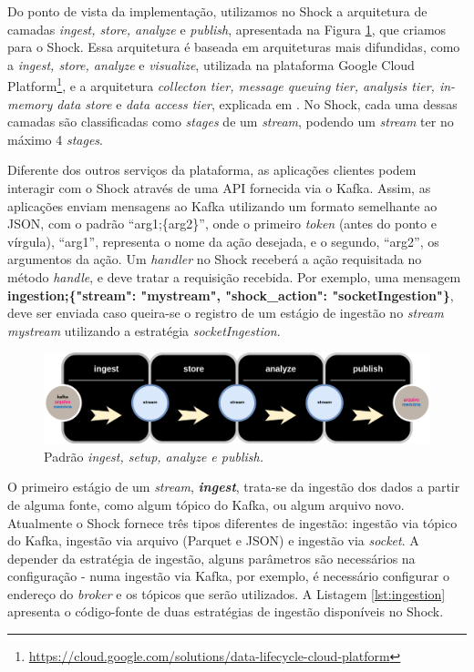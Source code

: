 Do ponto de vista da implementação, utilizamos no Shock a arquitetura de camadas
\textit{ingest, store, analyze} e \textit{publish}, apresentada na Figura
\ref{fig:ingeststore}, que criamos para o Shock. Essa arquitetura é baseada
em arquiteturas mais difundidas, como a \textit{ingest, store, analyze} e
\textit{visualize}, utilizada na plataforma Google Cloud
Platform\footnote{\url{https://cloud.google.com/solutions/data-lifecycle-cloud-platform}},
e a arquitetura \textit{collecton tier, message queuing tier, analysis tier,
in-memory data store} e \textit{data access tier}, explicada em
. No Shock, cada uma dessas camadas são
classificadas como \textit{stages} de um \textit{stream}, podendo um
\textit{stream} ter no máximo 4 \textit{stages}.

Diferente dos outros serviços da plataforma, as aplicações clientes podem interagir
com o Shock através de uma API fornecida via o Kafka. Assim, as aplicações enviam
mensagens ao Kafka utilizando um formato semelhante ao JSON, com o padrão ``arg1;\{arg2\}'',
onde o primeiro \textit{token} (antes do ponto e vírgula), ``arg1'', representa o nome
da ação desejada, e o segundo, ``arg2'', os argumentos da ação. Um
\textit{handler} no Shock receberá a ação requisitada no método
\textit{handle}, e deve tratar a requisição recebida. Por exemplo, uma mensagem
\small{\textbf{ingestion;\{"stream": "mystream", "shock\_action": "socketIngestion"\}}},
deve ser enviada caso queira-se o registro de um estágio de ingestão no
\textit{stream} \textit{mystream} utilizando a estratégia \textit{socketIngestion}.

\begin{figure}
  \centering
  \includegraphics[width=\textwidth]{figuras/arquiteturaforensic.png}
  \caption{Padrão \textit{ingest, setup, analyze e publish.}}
  \label{fig:ingeststore}
\end{figure}

O primeiro estágio de um \textit{stream}, \textit{\textbf{ingest}}, trata-se da
ingestão dos dados a partir de alguma fonte, como algum tópico do Kafka, ou
algum arquivo novo. Atualmente o Shock fornece três tipos diferentes de
ingestão: ingestão via tópico do Kafka, ingestão via arquivo (Parquet e JSON)
e ingestão via \textit{socket}. A depender da estratégia de ingestão, alguns
parâmetros são necessários na configuração - numa ingestão via Kafka, por
exemplo, é necessário configurar o endereço do \textit{broker} e os tópicos
que serão utilizados. A Listagem \ref{lst:ingestion} apresenta o código-fonte
de duas estratégias de ingestão disponíveis no Shock.

